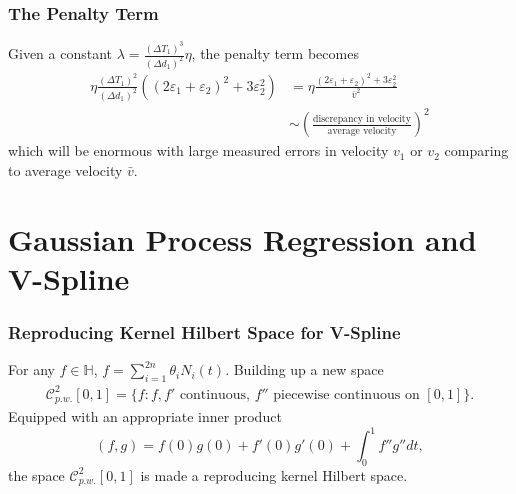 \documentclass{beamer}
\begin{document}
\begin{frame}
\frametitle{The Penalty Term}
Given a constant $\lambda = \frac{\left(\Delta T_1\right)^3}{\left(\Delta d_1\right)^2}\eta$, the penalty term becomes
\begin{equation}\begin{split}
\eta \frac{\left(\Delta T_1\right)^2}{\left(\Delta d_1\right)^2} \left(\left(2\varepsilon_1+\varepsilon_2\right)^2+3\varepsilon_2^2\right)
&= \eta \frac{\left(2\varepsilon_1+\varepsilon_2\right)^2+3\varepsilon_2^2}{\bar{v}^2} \\&\sim \left(\frac{\mbox{discrepancy in velocity}}{\mbox{average velocity}}\right)^2
\end{split}
\end{equation}
which will be enormous with large measured errors in velocity $v_1$ or $v_2$ comparing to average velocity $\bar{v}$. 
\end{frame}

\section{Gaussian Process Regression and V-Spline}

\begin{frame}
\frametitle{Reproducing Kernel Hilbert Space for V-Spline}

For any $f \in \mathbb{H}$, $f=\sum_{i=1}^{2n} \theta_i N_i(t).$ Building up a new space \begin{align*}
\mathcal{C}_{p.w.}^{2}[0,1]=\{f:f,f' \mbox{ continuous, } f'' \mbox{ piecewise continuous on } [0,1] \}.
\end{align*} 
Equipped with an appropriate inner product
\begin{equation}
(f,g)=f(0) g(0)+f'(0) g'(0)+\int_{0}^{1}f''g''dt,
\end{equation}
the space $\mathcal{C}_{p.w.}^{2}[0,1]$ is made a reproducing kernel Hilbert space.
\end{frame}
\end{document}
